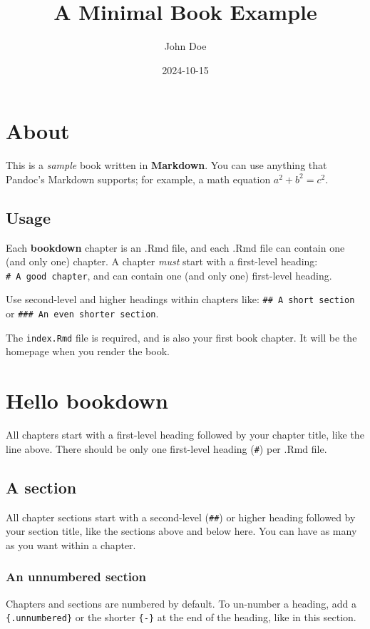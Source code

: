 \documentclass[
]{book}
\title{A Minimal Book Example}
\author{John Doe}
\date{2024-10-15}
\begin{document}
\maketitle

{
\setcounter{tocdepth}{1}
\tableofcontents
}
\chapter{About}\label{about}

This is a \emph{sample} book written in \textbf{Markdown}. You can use anything that Pandoc's Markdown supports; for example, a math equation \(a^2 + b^2 = c^2\).

\section{Usage}\label{usage}

Each \textbf{bookdown} chapter is an .Rmd file, and each .Rmd file can contain one (and only one) chapter. A chapter \emph{must} start with a first-level heading: \texttt{\#\ A\ good\ chapter}, and can contain one (and only one) first-level heading.

Use second-level and higher headings within chapters like: \texttt{\#\#\ A\ short\ section} or \texttt{\#\#\#\ An\ even\ shorter\ section}.

The \texttt{index.Rmd} file is required, and is also your first book chapter. It will be the homepage when you render the book.

\chapter{Hello bookdown}\label{hello-bookdown}

All chapters start with a first-level heading followed by your chapter title, like the line above. There should be only one first-level heading (\texttt{\#}) per .Rmd file.

\section{A section}\label{a-section}

All chapter sections start with a second-level (\texttt{\#\#}) or higher heading followed by your section title, like the sections above and below here. You can have as many as you want within a chapter.

\subsection*{An unnumbered section}\label{an-unnumbered-section}

Chapters and sections are numbered by default. To un-number a heading, add a \texttt{\{.unnumbered\}} or the shorter \texttt{\{-\}} at the end of the heading, like in this section.
\end{document}
